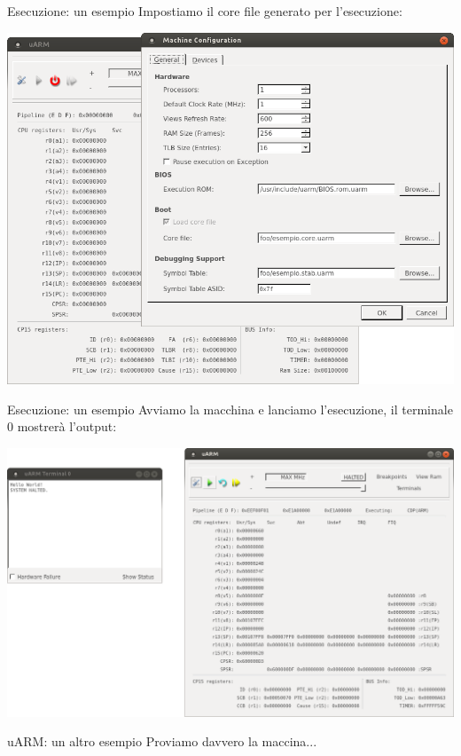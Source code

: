 \documentclass{beamer}
\begin{document}
\begin{frame}{Esecuzione: un esempio}
Impostiamo il core file generato per l'esecuzione:
\newline

\centering
\includegraphics[height=0.75\textheight]{img/esempio_config.png}
\end{frame}

\begin{frame}{Esecuzione: un esempio}
Avviamo la macchina e lanciamo l'esecuzione, il terminale 0 mostrerà l'output:

\centering
\includegraphics[height=0.75\textheight]{img/esempio_exec.png}
\end{frame}

\begin{frame}{uARM: un altro esempio}
\Large Proviamo davvero la maccina...
\end{frame}
\end{document}
